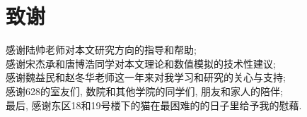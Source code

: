 \documentclass[notitlepage,cs4size,punct,oneside]{ctexrep}
\numberwithin{equation}{section}
\theoremstyle{mystyle}
\begin{document}





\chapter*{\heiti 致谢}
\begin{flushleft}
感谢陆帅老师对本文研究方向的指导和帮助; \\
感谢宋杰承和唐博浩同学对本文理论和数值模拟的技术性建议; \\
感谢魏益民和赵冬华老师这一年来对我学习和研究的关心与支持; \\
感谢628的室友们, 数院和其他学院的同学们, 朋友和家人的陪伴; \\
最后, 感谢东区18和19号楼下的猫在最困难的的日子里给予我的慰藉.
\end{flushleft}
\end{document}
